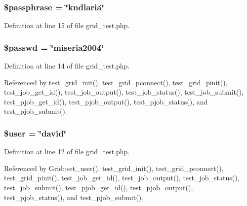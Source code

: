\subsubsection{\setlength{\rightskip}{0pt plus 5cm}\$passphrase = \char`\"{}kndlaria\char`\"{}}\label{grid__test_8php_a4}




Definition at line 15 of file grid\_\-test.php.
\subsubsection{\setlength{\rightskip}{0pt plus 5cm}\$passwd = \char`\"{}miseria2004\char`\"{}}\label{grid__test_8php_a3}




Definition at line 14 of file grid\_\-test.php.

Referenced by test\_\-grid\_\-init(), test\_\-grid\_\-pconnect(), test\_\-grid\_\-pinit(), test\_\-job\_\-get\_\-id(), test\_\-job\_\-output(), test\_\-job\_\-status(), test\_\-job\_\-submit(), test\_\-pjob\_\-get\_\-id(), test\_\-pjob\_\-output(), test\_\-pjob\_\-status(), and test\_\-pjob\_\-submit().
\subsubsection{\setlength{\rightskip}{0pt plus 5cm}\$user = \char`\"{}david\char`\"{}}\label{grid__test_8php_a1}




Definition at line 12 of file grid\_\-test.php.

Referenced by Grid::set\_\-user(), test\_\-grid\_\-init(), test\_\-grid\_\-pconnect(), test\_\-grid\_\-pinit(), test\_\-job\_\-get\_\-id(), test\_\-job\_\-output(), test\_\-job\_\-status(), test\_\-job\_\-submit(), test\_\-pjob\_\-get\_\-id(), test\_\-pjob\_\-output(), test\_\-pjob\_\-status(), and test\_\-pjob\_\-submit().